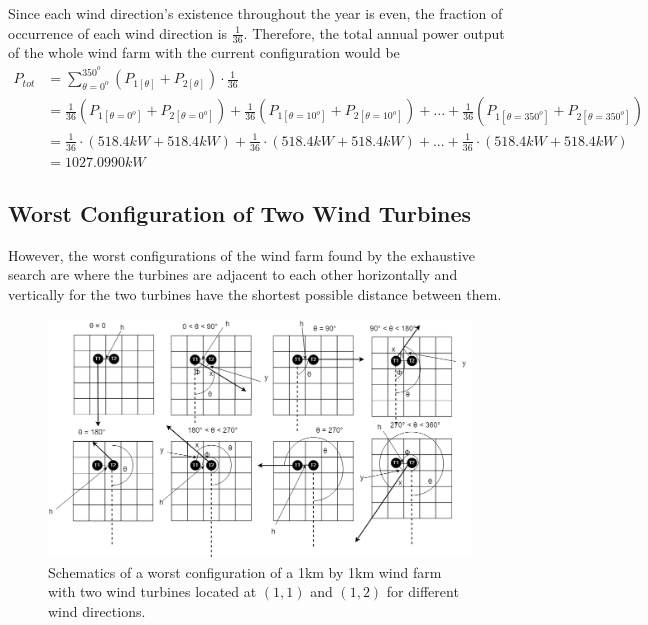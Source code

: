 Since each wind direction's existence throughout the year is even, the fraction of occurrence of each wind direction is $\frac{1}{36}$. Therefore, the total annual power output of the whole wind farm with the current configuration would be
\begin{align*}
    P_{tot}
    &= \sum_{\theta=0^o}^{350^o} \left( P_{1[\theta]} + P_{2[\theta]} \right) \cdot \frac{1}{36} \\
    &= \frac{1}{36}\left( P_{1[\theta=0^o]} + P_{2[\theta=0^o]} \right) + \frac{1}{36}\left( P_{1[\theta=10^o]} + P_{2[\theta=10^o]} \right) +...+ \frac{1}{36}\left( P_{1[\theta=350^o]} + P_{2[\theta=350^o]} \right) \\
    &= \frac{1}{36}\cdot\left( 518.4kW + 518.4kW \right) + \frac{1}{36}\cdot\left( 518.4kW + 518.4kW \right) +...+ \frac{1}{36}\cdot\left( 518.4kW + 518.4kW \right) \\
    &=1027.0990kW
\end{align*}

\subsection{Worst Configuration of Two Wind Turbines}
    However, the worst configurations of the wind farm found by the exhaustive search are where the turbines are adjacent to each other horizontally and vertically for the two turbines have the shortest possible distance between them.
    
    \begin{figure}[H]
        \centering
        \includegraphics[width=\linewidth]{Figures/worstSmall.png}
        \caption{Schematics of a worst configuration of a 1km by 1km wind farm with two wind turbines located at $(1,1)$ and $(1,2)$ for different wind directions.}
        \label{worstSmall}
    \end{figure}
    
